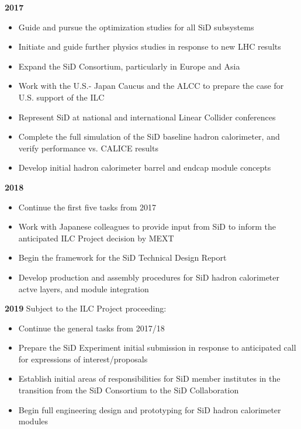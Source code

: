 \textbf{2017}
\begin{itemize}[noitemsep,nolistsep]
\item{Guide and pursue the optimization studies for all SiD subsystems}
\item{Initiate and guide further physics studies in response to new LHC results}
\item{Expand the SiD Consortium, particularly in Europe and Asia}
\item{Work with the U.S.- Japan Caucus and the ALCC to prepare the case for U.S. support of the ILC}
\item{Represent SiD at national and international Linear Collider conferences}
\item{Complete the full simulation of the SiD baseline hadron calorimeter, and verify performance vs. CALICE results}
\item{Develop initial hadron calorimeter barrel and endcap module concepts}
\end{itemize}

\textbf{2018}
\begin{itemize}[noitemsep,nolistsep]
\item{Continue the first five tasks from 2017}
\item{Work with Japanese colleagues to provide input from SiD to inform the anticipated ILC Project decision by MEXT}
\item{Begin the framework for the SiD Technical Design Report}
\item{Develop production and assembly procedures for SiD hadron calorimeter actve layers, and module integration}
\end{itemize}


\textbf{2019}
Subject to the ILC Project proceeding:
\begin{itemize}[noitemsep,nolistsep]
\item{Continue the general tasks from 2017/18}
\item{Prepare the SiD Experiment initial submission in response to anticipated call for expressions of interest/proposals}
\item{Establish initial areas of responsibilities for SiD member institutes in the transition from the SiD Consortium to the SiD Collaboration}
\item{Begin full engineering design and prototyping for SiD hadron calorimeter modules}
\end{itemize}


